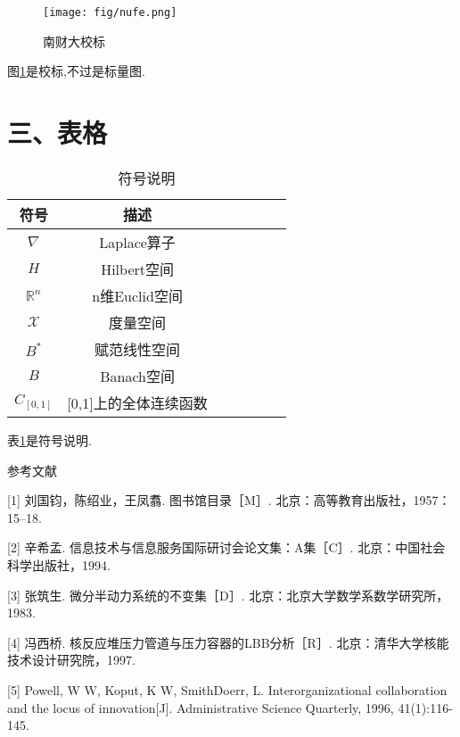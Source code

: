 \documentclass[a4paper]{article}
\newcommand{\cankaowenxian}{\CJKfamily{fsong}\fontsize{10.5pt}{15.75pt}\selectfont}
\newcommand{\biaoge}{\CJKfamily{fsong}\fontsize{10.5pt}{13.125pt}\selectfont}
\newcommand{\biaocaption}[1]{\caption{\hspace{1em}#1}}
\newcommand{\tucaption}[1]{\caption{\hspace{1em}#1}}
\begin{document}
{\begin{figure}[htpb]
    \centering
    \texttt{[image: fig/nufe.png]}
    \tucaption{南财大校标}
    \label{校标}
\end{figure}
图\ref{校标}是校标,不过是标量图.


\section*{三、表格}

{\biaoge
\begin{table}[H]
  \centering  %
  \biaocaption{符号说明}  %
  \label{notion} %
  \begin{tabular}{ccccccc} %
  \toprule  %
  {\bf 符号}  & {\bf 描述}\\[0.2cm]
  \midrule  %

$\nabla$ & Laplace算子 \\[0.2cm]

$H$ & Hilbert空间 \\[0.2cm]

$\mathbb{R}^n$ & n维Euclid空间 \\[0.2cm]

$\mathscr{X}$ & 度量空间 \\[0.2cm]

$B^*$ & 赋范线性空间 \\[0.2cm]

$B$ & Banach空间 \\[0.2cm]

$C_{[0,1]}$ & [0,1]上的全体连续函数 \\[0.2cm]

\bottomrule  %
\end{tabular}
\end{table}
}
表\ref{notion}是符号说明.


}

\vspace{2em}


{\cankaowenxian

\begin{center}
  {\fontsize{12pt}{28pt}\selectfont 参考文献}
\end{center}

[1] 刘国钧，陈绍业，王凤翥. 图书馆目录［M］. 北京：高等教育出版社，1957：15–18.

[2] 辛希孟. 信息技术与信息服务国际研讨会论文集：A集［C］. 北京：中国社会科学出版社，1994.

[3] 张筑生. 微分半动力系统的不变集［D］. 北京：北京大学数学系数学研究所，1983.

[4] 冯西桥. 核反应堆压力管道与压力容器的LBB分析［R］. 北京：清华大学核能技术设计研究院，1997.

[5] Powell, W W, Koput, K W, SmithDoerr, L. Interorganizational collaboration and the locus of innovation[J]. Administrative Science Quarterly, 1996, 41(1):116-145.

}
\end{document}
